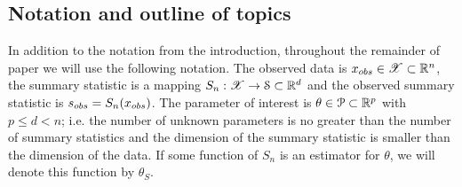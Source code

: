

	
\subsection{Notation and outline of topics}
In addition to the notation from the introduction, throughout the remainder of paper we will use the following notation. The observed data is $x_{\rm obs} \in \mathscr{X} \subset \mathbb{R}^n$, the summary statistic is a mapping $S_n: \mathscr{X} \rightarrow {\cal S} \subset \mathbb{R}^{d}$ and the observed summary statistic is $s_{\rm obs} = S_n(x_{\rm obs})$. The parameter of interest is $\theta \in \P \subset \mathbb{R}^p$ with $p \leq d < n$; i.e. the number of unknown parameters is no greater than the number of summary statistics and the dimension of the summary statistic is smaller than the dimension of the data. If some function of $S_n$ is an estimator for $\theta$, we will denote this function by $\hat{\theta}_S$. 


